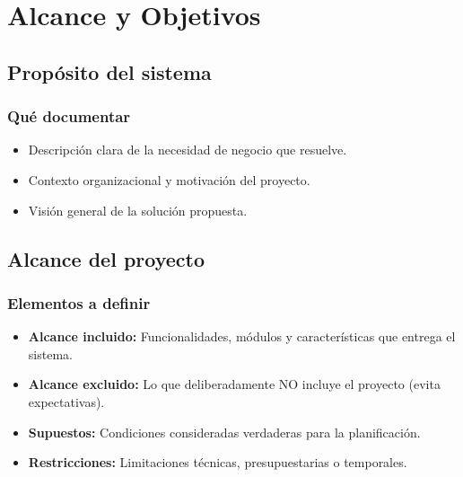 \documentclass[a4paper,11pt,spanish]{article}
\begin{document}
\vspace{1em}

\newpage

\section{Alcance y Objetivos}

\subsection{Propósito del sistema}

\subsubsection*{Qué documentar}

\begin{itemize}
    \item Descripción clara de la necesidad de negocio que resuelve.
    \item Contexto organizacional y motivación del proyecto.
    \item Visión general de la solución propuesta.
\end{itemize}

\vspace{1em}

\subsection{Alcance del proyecto}

\subsubsection*{Elementos a definir}

\begin{itemize}
    \item \textbf{Alcance incluido:} Funcionalidades, módulos y características que entrega el sistema.
    \item \textbf{Alcance excluido:} Lo que deliberadamente NO incluye el proyecto (evita expectativas).
    \item \textbf{Supuestos:} Condiciones consideradas verdaderas para la planificación.
    \item \textbf{Restricciones:} Limitaciones técnicas, presupuestarias o temporales.
\end{itemize}
\end{document}
